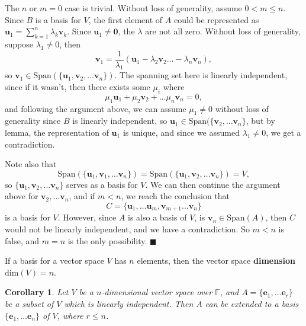 \documentclass[letter-paper]{tufte-book}
\newtheorem{corollary}[theorem]{\color{pastel-blue}Corollary}
\newenvironment{proof}[1][Proof]{\begin{trivlist}
\item[\hskip \labelsep {\bfseries #1}]}{\end{trivlist}}
\newcommand{\eb}{{\boldsymbol{e}}}
\newcommand{\ub}{{\boldsymbol{u}}}
\newcommand{\vb}{{\boldsymbol{v}}}
\newcommand{\qed}{\hfill$\blacksquare$}
\begin{document}
\begin{proof}
  The $n$ or $m=0$ case is trivial. Without loss of generality, assume $0 < m
  \leq n$. Since $B$ is a basis for $V$, the first element of $A$ could be
  represented as $\ub_1 = \sum_{k=1}^n \lambda_k \vb_k$. Since $\ub_1 \neq
  \boldsymbol{0}$, the $\lambda$ are not all zero. Without loss of generality,
  suppose $\lambda_1 \neq 0$, then
  \begin{equation*}
    \vb_1 = \frac{1}{\lambda_1}(\ub_1 - \lambda_2\vb_2 \ldots - \lambda_n \vb_n),
  \end{equation*}
  so $\vb_1 \in \mbox{Span}(\{\ub_1, \vb_2, \ldots \vb_n\})$. The spanning set
  here is linearly independent, since if it wasn't, then there exists some
  $\mu_i$ where
  \begin{equation*}
    \mu_1 \ub_1 + \mu_2 \vb_2 + \ldots \mu_n \vb_n = 0,
  \end{equation*}
  and following the argument above, we can assume $\mu_1 \neq 0$ without loss of
  generality since $B$ is linearly independent, so $\ub_1 \in
  \mbox{Span}(\{\vb_2, \ldots \vb_n \}$, but by lemma, the representation of
  $\ub_1$ is unique, and since we assumed $\lambda_1 \neq 0$, we get a
  contradiction. 
  
  Note also that
  \begin{equation*}
    \mbox{Span}(\{\ub_1, \vb_1, \ldots \vb_n\}) = \mbox{Span}(\{\ub_1, \vb_2, \ldots \vb_n\}) = V,
  \end{equation*}
  so $\{\ub_1, \vb_2, \ldots \vb_n\}$ serves as a basis for $V$. We can then
  continue the argument above for $\vb_2, \ldots \vb_n$, and if $m<n$, we reach
  the conclusion that
  \begin{equation*}
    C = \{\ub_1, \ldots \ub_m, \vb_{m+1} \ldots \vb_n\}
  \end{equation*}
  is a basis for $V$. However, since $A$ is also a basis of $V$, is $\vb_n \in
  \mbox{Span}(A)$, then $C$ would not be linearly independent, and we have a
  contradiction. So $m<n$ is false, and $m=n$ is the only possibility. \qed
\end{proof}

If a basis for a vector space $V$ has $n$ elements, then the vector space
\textbf{dimension} $\mbox{dim}(V) = n$.

\begin{corollary}\label{cor:extend}
  Let $V$ be a $n$-dimensional vector space over $\mathbb{F}$, and $A = \{\eb_1,
  \ldots \eb_r\}$ be a subset of $V$ which is linearly independent. Then $A$ can
  be extended to a basis $\{\eb_1, \ldots \eb_n\}$ of $V$, where $r \leq n$.
\end{corollary}
\end{document}
